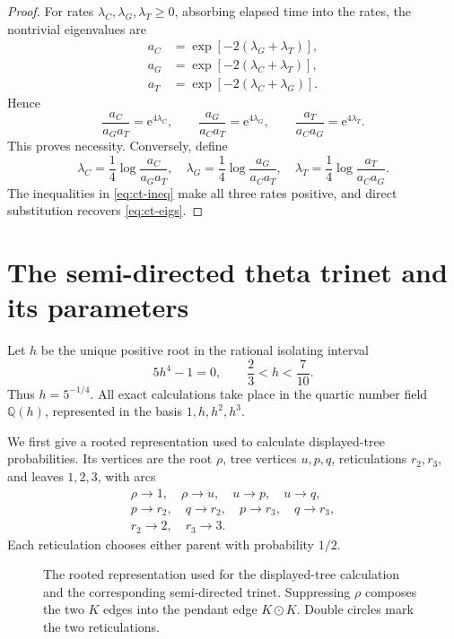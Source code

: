 \documentclass[11pt]{article}
\theoremstyle{remark}
\newcommand{\odotv}{\mathbin{\odot}}
\newcommand{\e}{\mathrm{e}}
\begin{document}
\begin{proof}
For rates $\lambda_C,\lambda_G,\lambda_T\geq0$, absorbing elapsed time into the rates, the nontrivial eigenvalues are
\begin{equation}\label{eq:ct-eigs}
\begin{aligned}
 a_C&=\exp[-2(\lambda_G+\lambda_T)],\\
 a_G&=\exp[-2(\lambda_C+\lambda_T)],\\
 a_T&=\exp[-2(\lambda_C+\lambda_G)].
\end{aligned}
\end{equation}
Hence
\[
 \frac{a_C}{a_Ga_T}=\e^{4\lambda_C},\qquad
 \frac{a_G}{a_Ca_T}=\e^{4\lambda_G},\qquad
 \frac{a_T}{a_Ca_G}=\e^{4\lambda_T}.
\]
This proves necessity.  Conversely, define
\[
 \lambda_C=\frac14\log\frac{a_C}{a_Ga_T},\quad
 \lambda_G=\frac14\log\frac{a_G}{a_Ca_T},\quad
 \lambda_T=\frac14\log\frac{a_T}{a_Ca_G}.
\]
The inequalities in \eqref{eq:ct-ineq} make all three rates positive, and direct substitution recovers \eqref{eq:ct-eigs}.
\end{proof}

\section{The semi-directed theta trinet and its parameters}

Let $h$ be the unique positive root in the rational isolating interval
\begin{equation}\label{eq:h}
  5h^4-1=0,
  \qquad \frac23<h<\frac7{10}.
\end{equation}
Thus $h=5^{-1/4}$.  All exact calculations take place in the quartic number field $\mathbb{Q}(h)$, represented in the basis $1,h,h^2,h^3$.

We first give a rooted representation used to calculate displayed-tree probabilities.  Its vertices are the root $\rho$, tree vertices $u,p,q$, reticulations $r_2,r_3$, and leaves $1,2,3$, with arcs
\begin{equation}\label{eq:arcs}
\begin{gathered}
 \rho\to1,\quad \rho\to u,\quad
 u\to p,\quad u\to q,\\
 p\to r_2,\quad q\to r_2,\quad
 p\to r_3,\quad q\to r_3,\\
 r_2\to2,\quad r_3\to3.
\end{gathered}
\end{equation}
Each reticulation chooses either parent with probability $1/2$.

\begin{figure}[ht]
  \centering
  \resizebox{\textwidth}{!}{}
  \caption{The rooted representation used for the displayed-tree calculation and the corresponding semi-directed trinet.  Suppressing $\rho$ composes the two $K$ edges into the pendant edge $K\odotv K$.  Double circles mark the two reticulations.}
  \label{fig:network}
\end{figure}
\end{document}
